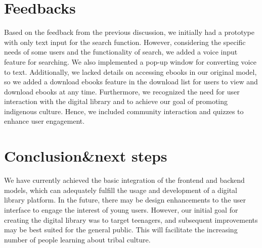 \chapter{Feedbacks}
Based on the feedback from the previous discussion, we initially had a prototype with only text input for the search function. However, considering the specific needs of some users and the functionality of search, we added a voice input feature for searching. We also implemented a pop-up window for converting voice to text. Additionally, we lacked details on accessing ebooks in our original model, so we added a download ebooks feature in the download list for users to view and download ebooks at any time. Furthermore, we recognized the need for user interaction with the digital library and to achieve our goal of promoting indigenous culture. Hence, we included community interaction and quizzes to enhance user engagement.


\chapter{Conclusion\&next steps} 

We have currently achieved the basic integration of the frontend and backend models, which can adequately fulfill the usage and development of a digital library platform. In the future, there may be design enhancements to the user interface to engage the interest of young users. However, our initial goal for creating the digital library was to target teenagers, and subsequent improvements may be best suited for the general public. This will facilitate the increasing number of people learning about tribal culture.


